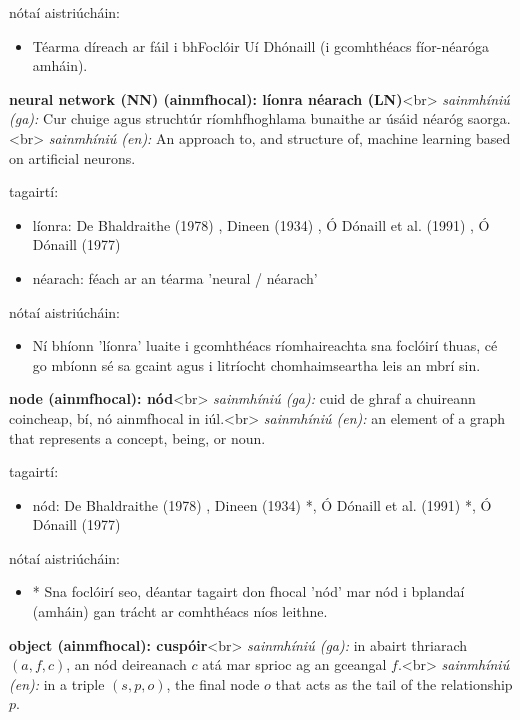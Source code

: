 \documentclass{article}
\begin{document}
nótaí aistriúcháin:
\begin{itemize}
	\item Téarma díreach ar fáil i bhFoclóir Uí Dhónaill (i gcomhthéacs fíor-néaróga amháin).
\end{itemize}


\textbf{neural network (NN) (ainmfhocal): líonra néarach (LN)}<br>
\textit{sainmhíniú (ga):} Cur chuige agus struchtúr ríomhfhoghlama bunaithe ar úsáid néaróg saorga.<br>
\textit{sainmhíniú (en):} An approach to, and structure of, machine learning based on artificial neurons.

tagairtí:
\begin{itemize}
	\item líonra: De Bhaldraithe (1978) \cite{de-bhaldraithe}, Dineen (1934) \cite{dineen}, Ó Dónaill et al. (1991) \cite{focloir-beag}, Ó Dónaill (1977) \cite{odonaill}
	\item néarach: féach ar an téarma 'neural / néarach'
\end{itemize}

nótaí aistriúcháin:
\begin{itemize}
	\item Ní bhíonn 'líonra' luaite i gcomhthéacs ríomhaireachta sna foclóirí thuas, cé go mbíonn sé sa gcaint agus i litríocht chomhaimseartha leis an mbrí sin.
\end{itemize}


\textbf{node (ainmfhocal): nód}<br>
\textit{sainmhíniú (ga):} cuid de ghraf a chuireann coincheap, bí, nó ainmfhocal in iúl.<br>
\textit{sainmhíniú (en):} an element of a graph that represents a concept, being, or noun.

tagairtí:
\begin{itemize}
	\item nód: De Bhaldraithe (1978) \cite{de-bhaldraithe}, Dineen (1934) \cite{dineen}*, Ó Dónaill et al. (1991) \cite{focloir-beag}*, Ó Dónaill (1977) \cite{odonaill}
\end{itemize}

nótaí aistriúcháin:
\begin{itemize}
	\item * Sna foclóirí seo, déantar tagairt don fhocal 'nód' mar nód i bplandaí (amháin) gan trácht ar comhthéacs níos leithne.
\end{itemize}


\textbf{object (ainmfhocal): cuspóir}<br>
\textit{sainmhíniú (ga):} in abairt thriarach $(a,f,c)$, an nód deireanach $c$ atá mar sprioc ag an gceangal $f$.<br>
\textit{sainmhíniú (en):} in a triple $(s,p,o)$, the final node $o$ that acts as the tail of the relationship $p$.
\end{document}
